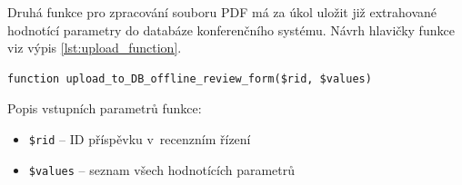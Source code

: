Druhá funkce pro zpracování souboru PDF má za úkol uložit již extrahované hodnotící parametry do databáze konferenčního systému. Návrh hlavičky funkce viz výpis \ref{lst:upload_function}.

\begin{lstlisting}[caption = {Návrh hlavičky funkce pro uložení dat do databáze}, label = {lst:upload_function}, captionpos=b]
function upload_to_DB_offline_review_form($rid, $values)
\end{lstlisting}
Popis vstupních parametrů funkce:
\begin{itemize}
	\item\verb|$rid| -- ID příspěvku v~recenzním řízení
	\item\verb|$values| -- seznam všech hodnotících parametrů 
\end{itemize}